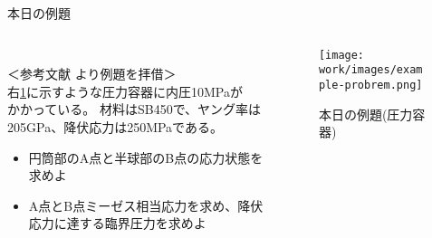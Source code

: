 \begin{frame}{本日の例題}
 
    \begin{columns}[t]
    \begin{column}{0.65\textwidth}
        \\
        ＜参考文献\cite{wanted} より例題を拝借＞ \\
        右\figurename \ref{fig:example-probrem}に示すような圧力容器に内圧10MPaが \\
        かかっている。
        材料はSB450で、ヤング率は205GPa、降伏応力は250MPaである。 \\
         \Add{[後述]}
        \begin{itemize}
          \item[①]{円筒部のA点と半球部のB点の応力状態を求めよ}
          \item[②]{A点とB点ミーゼス相当応力を求め、降伏応力に達する臨界圧力を求めよ}
        \end{itemize}
    \end{column}
    \begin{column}{0.35\textwidth}
      \begin{figure}[htbp]
        \begin{center}
          \texttt{[image: work/images/example-probrem.png]}
            \caption{本日の例題(圧力容器)} \label{fig:example-probrem}
        \end{center}
      \end{figure}
    \end{column}
  \end{columns}
\end{frame}
